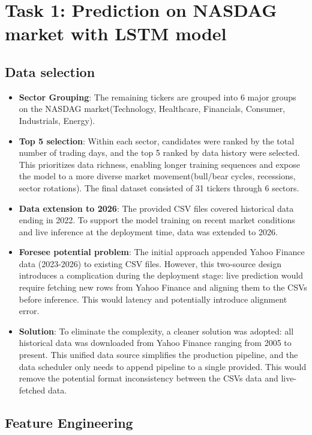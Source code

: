 \documentclass[12pt, a4paper]{article}
\begin{document}
\section{ Task 1: Prediction on NASDAG market with LSTM model}
\subsection{Data selection}
\begin{itemize}
 
 \item \textbf{Sector Grouping}: The remaining tickers are grouped into 6 major groups on the NASDAG market(Technology, Healthcare, Financials, Consumer, Industrials, Energy).
 \item \textbf{Top 5 selection}: Within each sector, candidates were ranked by the total number of trading days, and the top 5 ranked by data history were selected. This prioritizes data richness, enabling longer training sequences and expose the model to a more diverse market movement(bull/bear cycles, recessions, sector rotations). The final dataset consisted of 31 tickers through 6 sectors.
 \item \textbf{Data extension to 2026}: The provided CSV files covered historical data ending in 2022. To support the model training on recent market conditions and live inference at the deployment time, data was extended to 2026.

 \item \textbf{Foresee potential problem}: The initial approach appended Yahoo Finance data (2023-2026) to existing CSV files. However, this two-source design introduces a complication during the deployment stage: live prediction would require fetching new rows from Yahoo Finance and aligning them to the CSVs before inference. This would latency and potentially introduce alignment error.
 \item \textbf{Solution}: To eliminate the complexity, a cleaner solution was adopted: all historical data was downloaded from Yahoo Finance ranging from 2005 to present. This unified data source simplifies the production pipeline, and the data scheduler only needs to append pipeline to a single provided. This would remove the potential format inconsistency between the CSVs data and live-fetched data.
 \end{itemize}

\subsection{Feature Engineering}
\end{document}
